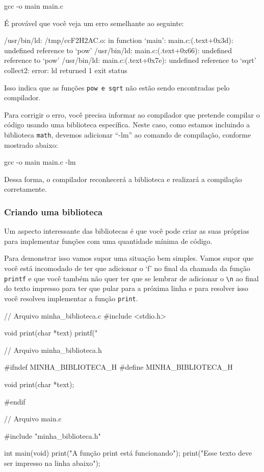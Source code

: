 \begin{textbox}
    gcc -o main main.c
\end{textbox}

É provável que você veja um erro semelhante ao seguinte:

\begin{textbox}
    /usr/bin/ld: /tmp/ccF2H2AC.o: in function `main':
    main.c:(.text+0x3d): undefined reference to `pow'
    /usr/bin/ld: main.c:(.text+0x66): undefined reference to `pow'
    /usr/bin/ld: main.c:(.text+0x7e): undefined reference to `sqrt'
    collect2: error: ld returned 1 exit status
\end{textbox}

Isso indica que as funções \texttt{pow e sqrt} não estão sendo encontradas 
pelo compilador.

Para corrigir o erro, você precisa informar ao compilador que pretende 
compilar o código usando uma biblioteca específica. Neste caso, como estamos 
incluindo a biblioteca \texttt{math}, devemos adicionar ``-lm'' ao comando de compilação, conforme mostrado abaixo:

\begin{textbox}
    gcc -o main main.c -lm
\end{textbox}

Dessa forma, o compilador reconhecerá a biblioteca e realizará a compilação 
corretamente.

\subsubsection{Criando uma biblioteca}

Um aspecto interessante das bibliotecas é que você pode criar as suas 
próprias para implementar funções com uma quantidade mínima de código.

Para demonstrar isso vamos supor uma situação bem simples. Vamos supor que 
você está incomodado de ter que adicionar o `f' no final da chamada da função 
\texttt{printf} e que você também não quer ter que se lembrar de adicionar o 
\texttt{\textbackslash n} ao final do texto impresso para ter que pular para a próxima 
linha e para resolver isso você resolveu implementar a função \texttt{print}.

\newpage
\begin{excode}
    // Arquivo minha_biblioteca.c
    #include <stdio.h>

    void print(char *text)
    {
        printf("%
    }

    // Arquivo minha_biblioteca.h

    #ifndef MINHA_BIBLIOTECA_H
    #define MINHA_BIBLIOTECA_H

    void print(char *text);

    #endif

    // Arquivo main.c    

    #include "minha_biblioteca.h"

    int main(void)
    {
        print("A função print está funcionando");
        print("Esse texto deve ser impresso na linha abaixo");
    }
\end{excode}

